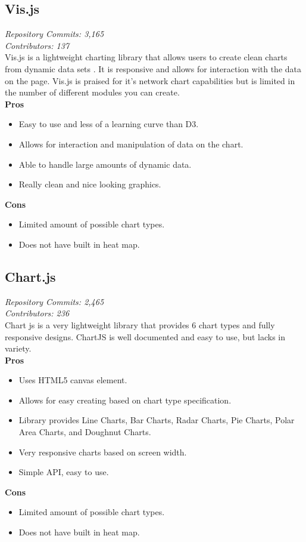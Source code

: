 \documentclass[onecolumn, draftclsnofoot,10pt, compsoc]{IEEEtran}
\begin{document}
\subsection{Vis.js}
\textit{Repository Commits: 3,165}\\
\textit{Contributors: 137}\\
Vis.js is a lightweight charting library that allows users to create clean charts from dynamic data sets \cite{vis}. It is responsive and allows for interaction with the data on the page. Vis.js is praised for it's network chart capabilities but is limited in the number of different modules you can create.\\
\textbf{Pros}
\begin{itemize}
\item Easy to use and less of a learning curve than D3.
\item Allows for interaction and manipulation of data on the chart.
\item Able to handle large amounts of dynamic data.
\item Really clean and nice looking graphics.
\end{itemize}
\textbf{Cons}
\begin{itemize}
\item Limited amount of possible chart types.
\item Does not have built in heat map.
\end{itemize}
\subsection{Chart.js}
\textit{Repository Commits: 2,465}\\ 
\textit{Contributors: 236}\\
Chart js is a very lightweight library that provides 6 chart types and fully responsive designs. ChartJS is well documented and easy to use, but lacks in variety.\\
\textbf{Pros}
\begin{itemize}
\item Uses HTML5 canvas element.
\item Allows for easy creating based on chart type specification.
\item Library provides Line Charts, Bar Charts, Radar Charts, Pie Charts, Polar Area Charts, and Doughnut Charts.
\item Very responsive charts based on screen width.
\item Simple API, easy to use.
\end{itemize}
\textbf{Cons}
\begin{itemize}
\item Limited amount of possible chart types.
\item Does not have built in heat map.
\end{itemize}
\end{document}

